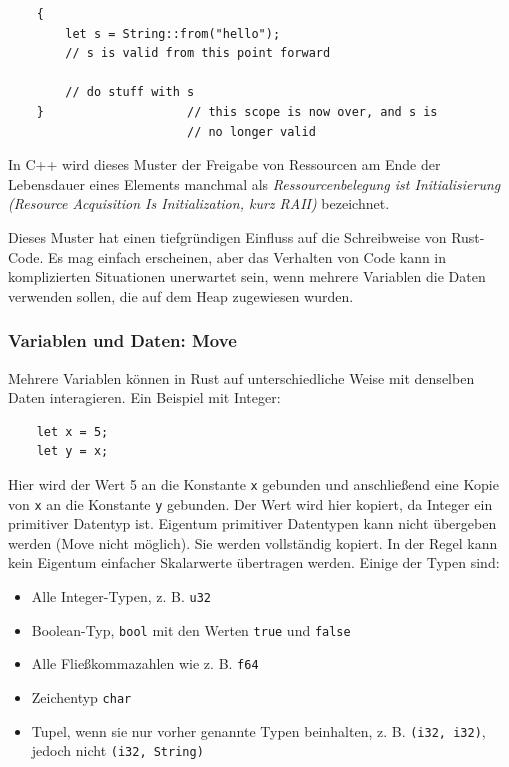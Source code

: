 \begin{lstlisting}
    {
        let s = String::from("hello");
        // s is valid from this point forward
    
        // do stuff with s
    }                    // this scope is now over, and s is
                         // no longer valid
\end{lstlisting}

In C++ wird dieses Muster der Freigabe von Ressourcen am Ende der Lebensdauer eines Elements manchmal als \textit{Ressourcenbelegung ist Initialisierung (Resource Acquisition Is Initialization, kurz RAII)} bezeichnet. \cite[p.~71]{CppProg}

Dieses Muster hat einen tiefgründigen Einfluss auf die Schreibweise von Rust-Code. Es mag einfach erscheinen, aber das Verhalten von Code kann in komplizierten Situationen unerwartet sein, wenn mehrere Variablen die Daten verwenden sollen, die auf dem Heap zugewiesen wurden.

\subsubsection{Variablen und Daten: Move}

Mehrere Variablen können in Rust auf unterschiedliche Weise mit denselben Daten interagieren. Ein Beispiel mit Integer:

\begin{lstlisting}
    let x = 5;
    let y = x;
\end{lstlisting}

Hier wird der Wert 5 an die Konstante \verb"x" gebunden und anschließend eine Kopie von \verb"x" an die Konstante \verb"y" gebunden. Der Wert wird hier kopiert, da Integer ein primitiver Datentyp ist. Eigentum primitiver Datentypen kann nicht übergeben werden (Move nicht möglich). Sie werden vollständig kopiert. In der Regel kann kein Eigentum einfacher Skalarwerte übertragen werden. Einige der Typen sind:

\begin{itemize}
    \item Alle Integer-Typen, z. B. \verb"u32"
    \item Boolean-Typ, \verb"bool" mit den Werten \verb"true" und \verb"false"
    \item Alle Fließkommazahlen wie z. B. \verb"f64"
    \item Zeichentyp \verb"char"
    \item Tupel, wenn sie nur vorher genannte Typen beinhalten, z. B. \verb"(i32, i32)", jedoch nicht \verb"(i32, String)"
\end{itemize}

